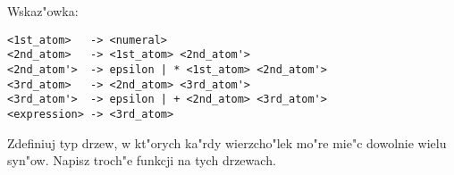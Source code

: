 \begin{exercises}
Wskaz"owka:
\begin{verbatim}
<1st_atom>   -> <numeral>
<2nd_atom>   -> <1st_atom> <2nd_atom'>
<2nd_atom'>  -> epsilon | * <1st_atom> <2nd_atom'>
<3rd_atom>   -> <2nd_atom> <3rd_atom'>
<3rd_atom'>  -> epsilon | + <2nd_atom> <3rd_atom'>
<expression> -> <3rd_atom>
\end{verbatim}

\item
Zdefiniuj typ drzew, w kt"orych ka"rdy wierzcho"lek mo"re mie"c
dowolnie wielu syn"ow. Napisz troch"e funkcji na tych drzewach.

\end{exercises}


